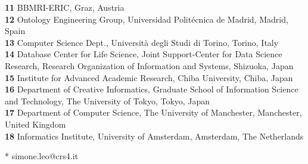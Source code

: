 \documentclass[10pt,letterpaper]{article}
\begin{document}
\begin{flushleft}
\textbf{11} BBMRI-ERIC, Graz, Austria
\\
\textbf{12} Ontology Engineering Group, Universidad Politécnica de Madrid, Madrid, Spain
\\
\textbf{13} Computer Science Dept., Università degli Studi di Torino, Torino, Italy
\\
\textbf{14} Database Center for Life Science, Joint Support-Center for Data Science Research, Research Organization of Information and Systems, Shizuoka, Japan
\\
\textbf{15} Institute for Advanced Academic Research, Chiba University, Chiba, Japan
\\
\textbf{16} Department of Creative Informatics, Graduate School of Information Science and Technology, The University of Tokyo, Tokyo, Japan
\\
\textbf{17} Department of Computer Science, The University of Manchester, Manchester, United Kingdom
\\
\textbf{18} Informatics Institute, University of Amsterdam, Amsterdam, The Netherlands
\\
\bigskip

% 
%





* simone.leo@crs4.it

\end{flushleft}
\end{document}
